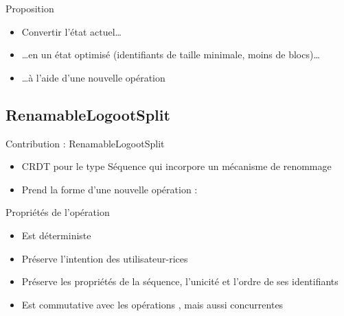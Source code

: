 \begin{frame}[fragile]{Proposition}
\begin{block}{}
\begin{figure}
{
            }
          \end{figure}
          \begin{itemize}
            \item \alert{Convertir l'état} actuel\dots
            \item<2-> \dots \alert{en un état optimisé} (identifiants de taille minimale, moins de blocs)\dots
            \item<3-> \dots à l'aide d'une \alert{nouvelle opération}
          \end{itemize}
    \end{block}
\end{frame}

\subsection{RenamableLogootSplit}

\begin{frame}{Contribution : RenamableLogootSplit}
    \begin{itemize}
        \item CRDT pour le type Séquence qui incorpore un mécanisme de renommage
        \item Prend la forme d'une nouvelle opération : \ren
    \end{itemize}
    \begin{block}{Propriétés de l'opération \ren}
        \begin{itemize}
            \item Est déterministe
            \item Préserve l'intention des utilisateur-rices
            \item Préserve les propriétés de la séquence, \ie l'unicité et l'ordre de ses identifiants
            \item Est commutative avec les opérations \ins, \rmv mais aussi \ren concurrentes
        \end{itemize}
    \end{block}
\end{frame}

